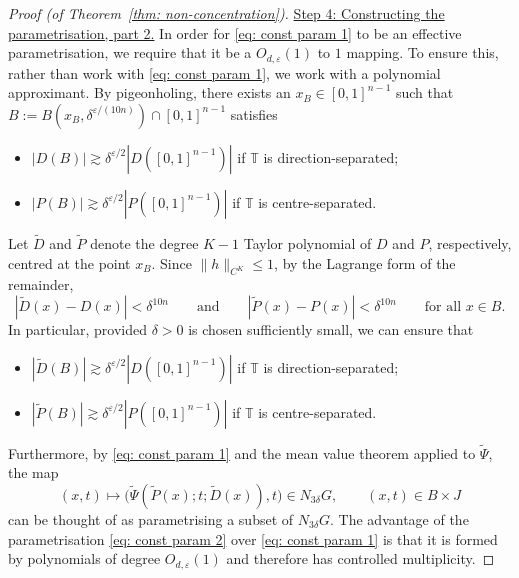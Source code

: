 \documentclass[reqno]{amsart}
\numberwithin{equation}{section}
\newcommand{\T}{\mathbb{T}}
\theoremstyle{plain}
\theoremstyle{definition}
\begin{document}
\begin{proof}[Proof (of Theorem~\ref{thm: non-concentration})]



\noindent \underline{Step 4: Constructing the parametrisation, part 2.} In order for \eqref{eq: const param 1} to be an effective parametrisation, we require that it be a $O_{d,\varepsilon}(1)$ to $1$ mapping. To ensure this, rather than work with \eqref{eq: const param 1}, we work with a polynomial approximant. By pigeonholing, there exists an $x_B \in [0,1]^{n-1}$ such that $B := B(x_B,\delta^{\varepsilon/(10n)}) \cap [0,1]^{n-1}$ satisfies 
\begin{itemize}
    \item $|D(B)|\gtrsim \delta^{\varepsilon/2}|D([0,1]^{n-1})|$ if $\T$ is direction-separated; \smallskip
    \item $|P(B)|\gtrsim \delta^{\varepsilon/2}|P([0,1]^{n-1})|$  if $\T$ is centre-separated.
\end{itemize} 
Let $\widetilde{D}$ and $\widetilde{P}$ denote the degree $K-1$ Taylor polynomial of $D$ and $P$, respectively, centred at the point $x_B$. Since $\|h\|_{C^K} \leq 1$, by the Lagrange form of the remainder, 
\begin{equation*}
    |\widetilde{D}(x) - D(x)| < \delta^{10n} \qquad \textrm{and} \qquad |\widetilde{P}(x) - P(x)| < \delta^{10n} \qquad \textrm{for all $x \in B$.}
\end{equation*}
In particular, provided $\delta > 0$ is chosen sufficiently small, we can ensure that 
\begin{itemize}
    \item $|\widetilde{D}(B)|\gtrsim \delta^{\varepsilon/2}|D([0,1]^{n-1})|$ if $\T$ is direction-separated; \smallskip
    \item $|\widetilde{P}(B)|\gtrsim \delta^{\varepsilon/2}|P([0,1]^{n-1})|$  if $\T$ is centre-separated.
\end{itemize}
Furthermore, by \eqref{eq: const param 1} and the mean value theorem applied to $\widetilde{\Psi}$, the map 
\begin{equation}\label{eq: const param 2}
  (x, t) \mapsto  \big(\widetilde{\Psi}(\widetilde{P}(x); t; \widetilde{D}(x)),t\big) \in  N_{3\delta} G, \qquad (x,t) \in B \times J
\end{equation}
can be thought of as parametrising a subset of $N_{3\delta} G$. The advantage of the parametrisation \eqref{eq: const param 2} over \eqref{eq: const param 1} is that it is formed by polynomials of degree $O_{d, \varepsilon}(1)$ and therefore has controlled multiplicity.


\end{proof}
\end{document}
